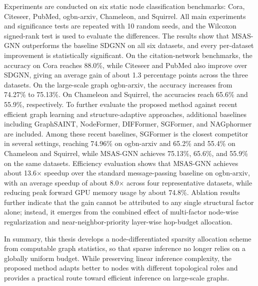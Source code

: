 \begin{abstract*}
Experiments are conducted on six static node classification benchmarks: Cora, Citeseer, PubMed, ogbn-arxiv, Chameleon, and Squirrel. All main experiments and significance tests are repeated with 10 random seeds, and the Wilcoxon signed-rank test is used to evaluate the differences. The results show that MSAS-GNN outperforms the baseline SDGNN on all six datasets, and every per-dataset improvement is statistically significant. On the citation-network benchmarks, the accuracy on Cora reaches 88.0\%, while Citeseer and PubMed also improve over SDGNN, giving an average gain of about 1.3 percentage points across the three datasets. On the large-scale graph ogbn-arxiv, the accuracy increases from 74.27\% to 75.13\%. On Chameleon and Squirrel, the accuracies reach 65.6\% and 55.9\%, respectively. To further evaluate the proposed method against recent efficient graph learning and structure-adaptive approaches, additional baselines including GraphSAINT, NodeFormer, DIFFormer, SGFormer, and NAGphormer are included. Among these recent baselines, SGFormer is the closest competitor in several settings, reaching 74.96\% on ogbn-arxiv and 65.2\% and 55.4\% on Chameleon and Squirrel, while MSAS-GNN achieves 75.13\%, 65.6\%, and 55.9\% on the same datasets. Efficiency evaluation shows that MSAS-GNN achieves about 13.6$\times$ speedup over the standard message-passing baseline on ogbn-arxiv, with an average speedup of about 8.0$\times$ across four representative datasets, while reducing peak forward GPU memory usage by about 74.8\%. Ablation results further indicate that the gain cannot be attributed to any single structural factor alone; instead, it emerges from the combined effect of multi-factor node-wise regularization and near-neighbor-priority layer-wise hop-budget allocation.

In summary, this thesis develops a node-differentiated sparsity allocation scheme from computable graph statistics, so that sparse inference no longer relies on a globally uniform budget. While preserving linear inference complexity, the proposed method adapts better to nodes with different topological roles and provides a practical route toward efficient inference on large-scale graphs.

\end{abstract*}